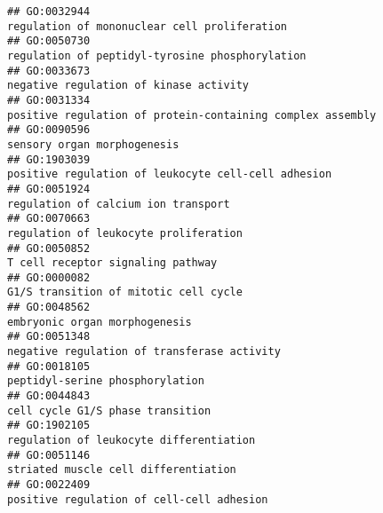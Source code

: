\documentclass[
]{article}
\begin{document}
\begin{verbatim}
## GO:0032944                                                                                                     regulation of mononuclear cell proliferation
## GO:0050730                                                                                                  regulation of peptidyl-tyrosine phosphorylation
## GO:0033673                                                                                                           negative regulation of kinase activity
## GO:0031334                                                                                       positive regulation of protein-containing complex assembly
## GO:0090596                                                                                                                      sensory organ morphogenesis
## GO:1903039                                                                                              positive regulation of leukocyte cell-cell adhesion
## GO:0051924                                                                                                              regulation of calcium ion transport
## GO:0070663                                                                                                            regulation of leukocyte proliferation
## GO:0050852                                                                                                                T cell receptor signaling pathway
## GO:0000082                                                                                                            G1/S transition of mitotic cell cycle
## GO:0048562                                                                                                                    embryonic organ morphogenesis
## GO:0051348                                                                                                      negative regulation of transferase activity
## GO:0018105                                                                                                                  peptidyl-serine phosphorylation
## GO:0044843                                                                                                                 cell cycle G1/S phase transition
## GO:1902105                                                                                                          regulation of leukocyte differentiation
## GO:0051146                                                                                                             striated muscle cell differentiation
## GO:0022409                                                                                                        positive regulation of cell-cell adhesion

\end{verbatim}
\end{document}
